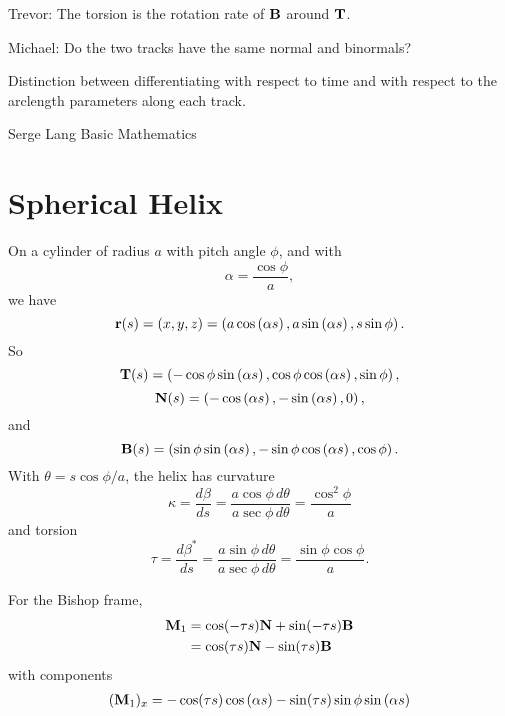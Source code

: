 \documentclass{ximera}
\begin{document}
Trevor: The torsion is the rotation rate of ${\bf B}$ around ${\bf T}$.

Michael: Do the two tracks have the same normal and binormals?

Distinction between differentiating with respect to time and with respect to the arclength parameters along each track.

Serge Lang Basic Mathematics

\section*{Spherical Helix}
On a cylinder of radius $a$ with pitch angle $\phi$, and with 
\[
    \alpha = \frac{\cos\phi}{a},
\]
we have
\[
   {\bf r}(s) =  (x,y,z) = \left( a \cos \left( \alpha s \right) , a \sin \left( \alpha s \right), s \sin \phi  \right) .
\]
So
\[
     {\bf T}(s) = \left( - \cos\phi \sin \left( \alpha s \right)  ,\cos\phi   \cos \left( \alpha s \right)  , \sin \phi         \right) ,
\]
\[
         {\bf N}(s) = \left(  - \cos \left( \alpha s \right)  ,   -\sin \left( \alpha s \right) , 0    \right) ,
\]
and
\[
     {\bf B}(s) = \left(   \sin\phi  \sin \left( \alpha s \right) ,   -\sin\phi    \cos \left(\alpha s\right) , \cos\phi \right) .
\]
With $\theta = s\cos\phi/a$, the helix has curvature
\[
    \kappa = \frac{d\beta}{ds} = \frac{a\cos\phi \, d\theta}{a\sec\phi \, d\theta} = \frac{\cos^2\phi}{a}
\]
and torsion
\[
     \tau = \frac{d\beta^*}{ds} = \frac{a\sin\phi \, d\theta}{a\sec\phi \, d\theta} = \frac{\sin\phi\cos\phi}{a}.
\]

For the Bishop frame,
\begin{align*}
{\bf M}_1 &= \cos(-\tau s) {\bf N} + \sin(-\tau s) {\bf B}     \\
               &= \cos(\tau s) {\bf N} - \sin(\tau s) {\bf B} \\
\end{align*}
with components
\begin{align*}
     ( {\bf M}_1)_x &= - \cos(\tau s)\cos \left( \alpha s \right) - \sin(\tau s)   \sin\phi  \sin \left( \alpha s \right) \\
\end{align*}
\end{document}
